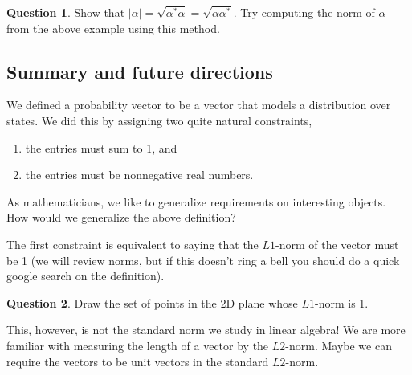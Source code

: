 \documentclass[letterpaper, 12pt]{article}
\newcommand{\1}{\mathds{1}}	%
\theoremstyle{definition}
\newtheorem{question}{Question}
\begin{document}

\begin{question}
    Show that $|\alpha| = \sqrt{\alpha^* \alpha} = \sqrt{\alpha \alpha^*}$. Try computing the norm of $\alpha$ from the above example using this method.
\end{question}
\vspace{30mm}


\newpage
\subsection{Summary and future directions}

We defined a probability vector to be a vector that models a distribution over states. We did this by assigning two quite natural constraints, 
\begin{enumerate}
    \item the entries must sum to 1, and 
    \item the entries must be nonnegative real numbers.
\end{enumerate}
As mathematicians, we like to generalize requirements on interesting objects. How would we generalize the above definition? 

The first constraint is equivalent to saying that the $L1$-norm of the vector must be 1 (we will review norms, but if this doesn't ring a bell you should do a quick google search on the definition). 

\vspace{30mm}

\begin{question}
    Draw the set of points in the 2D plane whose $L1$-norm is 1. 
\end{question}

\vspace{30mm}

This, however, is not the standard norm we study in linear algebra! We are more familiar with measuring the length of a vector by the $L2$-norm. Maybe we can require the vectors to be unit vectors in the standard $L2$-norm. 
\end{document}
